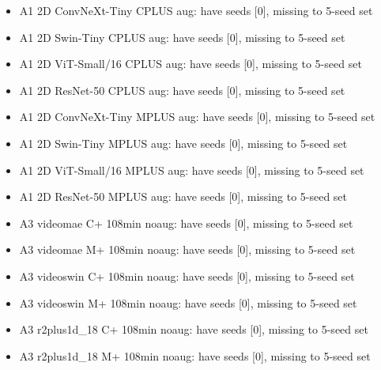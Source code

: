 \begin{itemize}
\item A1 2D ConvNeXt-Tiny CPLUS aug: have seeds [0], missing to 5-seed set
\item A1 2D Swin-Tiny CPLUS aug: have seeds [0], missing to 5-seed set
\item A1 2D ViT-Small/16 CPLUS aug: have seeds [0], missing to 5-seed set
\item A1 2D ResNet-50 CPLUS aug: have seeds [0], missing to 5-seed set
\item A1 2D ConvNeXt-Tiny MPLUS aug: have seeds [0], missing to 5-seed set
\item A1 2D Swin-Tiny MPLUS aug: have seeds [0], missing to 5-seed set
\item A1 2D ViT-Small/16 MPLUS aug: have seeds [0], missing to 5-seed set
\item A1 2D ResNet-50 MPLUS aug: have seeds [0], missing to 5-seed set
\item A3 videomae C+ 108min noaug: have seeds [0], missing to 5-seed set
\item A3 videomae M+ 108min noaug: have seeds [0], missing to 5-seed set
\item A3 videoswin C+ 108min noaug: have seeds [0], missing to 5-seed set
\item A3 videoswin M+ 108min noaug: have seeds [0], missing to 5-seed set
\item A3 r2plus1d\_18 C+ 108min noaug: have seeds [0], missing to 5-seed set
\item A3 r2plus1d\_18 M+ 108min noaug: have seeds [0], missing to 5-seed set
\end{itemize}
